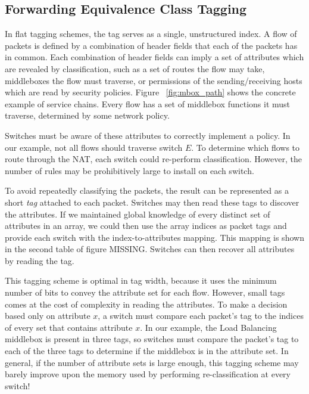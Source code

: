 \subsection{Forwarding Equivalence Class Tagging} 
\label{ssec:fec-tagging}
In flat tagging schemes, the
tag serves as a single, unstructured index.  A flow of packets is defined by a
combination of header fields that each of the packets has in common. Each
combination of header fields can imply a set of attributes which are revealed by
classification, such as a set of routes the flow may take, middleboxes the flow
must traverse, or permissions of the sending/receiving hosts which are read by
security policies.  Figure ~\ref{fig:mbox_path} shows the concrete example of
service chains. Every flow has a set of middlebox functions it must traverse,
determined by some network policy.

Switches must be aware of these attributes to correctly implement a policy. In
our example, not all flows should traverse switch $E$. To determine which flows
to route through the NAT, each switch could re-perform classification. However,
the number of rules may be prohibitively large to install on each switch.  

To avoid repeatedly classifying the packets, the result can be represented as a
short \textit{tag} attached to each packet. Switches may then read these tags to
discover the attributes. If we maintained global knowledge of every distinct set
of attributes in an array, we could then use the array indices as packet tags
and provide each switch with the index-to-attributes mapping. This mapping is
shown in the second table of figure MISSING. Switches can then recover all
attributes by reading the tag.


This tagging scheme is optimal in tag width, because it uses the minimum number
of bits to convey the attribute set for each flow. However, small tags comes at
the cost of complexity in reading the attributes.  To make a decision based only
on attribute $x$, a switch must compare each packet's tag to the indices of
every set that contains attribute $x$. In our example, the Load Balancing
middlebox is present in three tags, so switches must compare the packet's tag to
each of the three tags to determine if the middlebox is in the attribute set. In
general, if the number of attribute sets is large enough, this tagging scheme
may barely improve upon the memory used by performing re-classification at every
switch!

